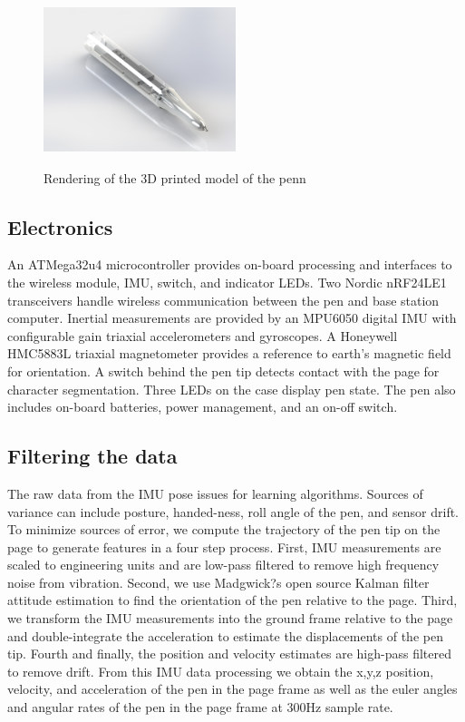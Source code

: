 \documentclass{article}
\begin{document}
\begin{figure}[H]
	\centering
	\includegraphics[width=0.5\textwidth, height= 5cm]{pen_render.png}
	\caption{Rendering of the 3D printed model of the penn}
\end{figure}

\subsection{Electronics}
An ATMega32u4 microcontroller provides on-board processing and interfaces to the wireless module, IMU, switch, and indicator LEDs. Two Nordic nRF24LE1 transceivers handle wireless communication between the pen and base station computer. Inertial measurements are provided by an MPU6050 digital IMU with configurable gain triaxial accelerometers and gyroscopes. A Honeywell HMC5883L triaxial magnetometer provides a reference to earth's magnetic field for orientation. A switch behind the pen tip detects contact with the page for character segmentation. Three LEDs on the case display pen state. The pen also includes on-board batteries, power management, and an on-off switch.

\subsection{Filtering the data}

The raw data from the IMU pose issues for learning algorithms. Sources of variance can include posture, handed-ness, roll angle of the pen, and sensor drift. To minimize sources of error, we compute the trajectory of the pen tip on the page to generate features in a four step process.  First, IMU measurements are scaled to engineering units and are low-pass filtered to remove high frequency noise from vibration.  Second, we use Madgwick?s open source Kalman filter attitude estimation to find the orientation of the pen relative to the page.  Third, we transform the IMU measurements into the ground frame relative to the page and double-integrate the acceleration to estimate the displacements of the pen tip.  Fourth and finally, the position and velocity estimates are high-pass filtered to remove drift.  From this IMU data processing we obtain the x,y,z position, velocity, and acceleration of the pen in the page frame as well as the euler angles and angular rates of the pen in the page frame at 300Hz sample rate.
\end{document}
